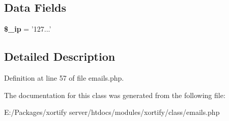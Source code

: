 \subsection*{Data Fields}
\begin{DoxyCompactItemize}
\item 
\hypertarget{class_xortify_emails_ac275a475a83ee8de16cf9c9f928fbe77}{{\bfseries \$\-\_\-ip} = '127...'}\label{class_xortify_emails_ac275a475a83ee8de16cf9c9f928fbe77}

\end{DoxyCompactItemize}


\subsection{Detailed Description}


Definition at line 57 of file emails.\-php.



The documentation for this class was generated from the following file\-:\begin{DoxyCompactItemize}
\item 
E\-:/\-Packages/xortify server/htdocs/modules/xortify/class/emails.\-php\end{DoxyCompactItemize}
